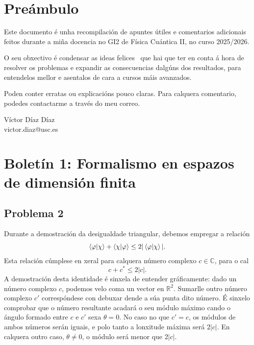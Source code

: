 \documentclass[a4paper,12pt]{article}
\begin{document}
\section*{Preámbulo}

Este documento é unha recompilación de apuntes útiles e comentarios adicionais feitos durante a miña docencia no GI2 de Física Cuántica II, no curso 2025/2026.

O seu obxectivo é condensar as \guillemotleft ideas felices\guillemotright ~ que hai que ter en conta á hora de resolver os problemas e expandir as consecuencias dalgúns dos resultados, para entendelos mellor e asentalos de cara a cursos máis avanzados.

Poden conter erratas ou explicacións pouco claras. Para calquera comentario, podedes contactarme a través do meu correo.

\vspace{10mm}

\begin{flushright}
	Víctor Díaz Díaz \\
	victor.diaz@usc.es
\end{flushright}

\newpage

\section*{Boletín 1: Formalismo en espazos de dimensión finita}

\subsection*{Problema 2}

Durante a demostración da desigualdade triangular, debemos empregar a relación
\begin{equation}
	\braket{\varphi}{\chi} + \braket{\chi}{\varphi} \leq 2 |\braket{\varphi}{\chi}|.
\end{equation}
\noindent
Esta relación cúmplese en xeral para calquera número complexo $c \in \mathbb{C}$, para o cal
\begin{equation}
	c + c^* \leq 2 |c|.
\end{equation}
\noindent
A demostración desta identidade é sinxela de entender gráficamente: dado un número complexo $c$, podemos velo coma un vector en $\mathbb{R}^2$. Sumarlle outro número complexo $c'$ correspóndese con debuxar dende a súa punta dito número. É sinxelo comprobar que o número resultante acadará o seu módulo máximo cando o ángulo formado entre $c$ e $c'$ sexa $\theta = 0$. No caso no que $c' = c$, os módulos de ambos números serán iguais, e polo tanto a lonxitude máxima será $2 |c|$. En calquera outro caso, $\theta \neq 0$, o módulo será menor que $2 |c|$.
\end{document}
